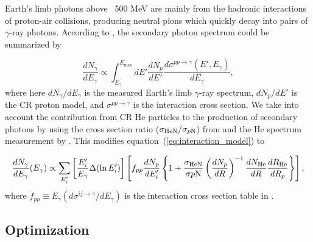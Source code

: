 Earth's limb photons above ~500 MeV are mainly from the hadronic
interactions of proton-air collisions, producing neutral pions
which quickly decay into pairs of $\gamma$-ray photons. According to \cite{K&Omodel},
the secondary photon spectrum could be summarized by

\begin{equation}
    \frac{dN_\gamma}{dE_\gamma}\propto \int^{E_{\text{max}}}_{E_\gamma} dE'\frac{dN_p}{dE'} \frac{d\sigma^{pp\rightarrow\gamma}(E',E_\gamma)}{dE_\gamma}
    ,\label{eq:interaction_model}
\end{equation}
where here $dN_\gamma/dE_\gamma$ is the measured Earth's limb $\gamma$-ray spectrum,
$dN_p/dE'$ is the CR proton model, and $\sigma^{pp\rightarrow\gamma}$ is the interaction
cross section.
We take into account the contribution from CR He particles to the production of secondary
photons by using the cross section ratio ($\sigma_{\rm HeN}/\sigma_{p\rm N}$) from
\cite{WAtwater} and the He spectrum measurement by \cite{AMS-02Helium}. This modifies
equation~(\ref{eq:interaction_model}) to

\begin{equation}
    \frac{dN_{\gamma}}{dE_\gamma}(E_\gamma) \propto
    \sum_{E'_i}\left[\frac{E'_i}{E_{\gamma}}\Delta(\ln E'_i) \right]
    \left[ 
        f_{pp}\frac{dN_p}{dE'_i}
        \left\{
            1+\frac{\sigma_{\text{HeN}}}{\sigma{p\rm N}}\left(\frac{dN_p}{dR}\right)^{-1} \frac{dN_{\text{He}}}{dR} \frac{dR_{\text{He}}}{dR_p} 
        \right\}
    \right]
    ,\label{eq:derived_model}
\end{equation}
where $f_{pp} \equiv E_\gamma(d\sigma^{ij\rightarrow\gamma}/dE_\gamma)$
is the interaction cross section table in \cite{K&Omodel}.

\subsection{Optimization}

